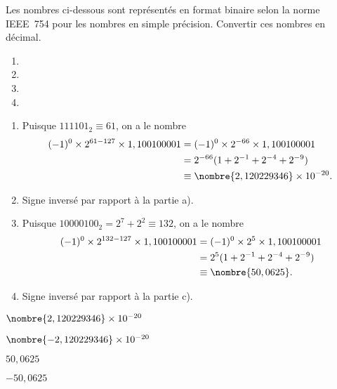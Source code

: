 \begin{exercice}
  \label{ex:ieee} Les nombres ci-dessous sont représentés en
  format binaire selon la norme IEEE~754 pour les nombres en simple
  précision. Convertir ces nombres en décimal.
  \begin{enumerate}
  \item {}
  \item {}
  \item {}
  \item {}
  \end{enumerate}
  \begin{sol}
    \begin{enumerate}
    \item Puisque $111101_2 \equiv 61$, on a le nombre
      \begin{align*}
        (-1)^0 \times 2^{61 - 127} \times 1,100100001
        &= (-1)^0 \times 2^{-66} \times 1,100100001 \\
        &= 2^{-66} (1 + 2^{-1} + 2^{-4} + 2^{-9}) \\
        &\equiv \nombre{2,120229346} \times 10^{-20}.
      \end{align*}
    \item Signe inversé par rapport à la partie a).
    \item Puisque $10000100_2 = 2^7 + 2^2 \equiv 132$, on a le nombre
      \begin{align*}
        (-1)^0 \times 2^{132 - 127} \times 1,100100001
        &= (-1)^0 \times 2^5 \times 1,100100001 \\
        &= 2^5 (1 + 2^{-1} + 2^{-4} + 2^{-9}) \\
        &\equiv \nombre{50,0625}.
      \end{align*}
    \item Signe inversé par rapport à la partie c).
    \end{enumerate}
  \end{sol}
  \begin{rep}
    \sloppy
    \begin{inparaenum}
    \item $\nombre{2,120229346} \times 10^{-20}$
    \item $\nombre{-2,120229346} \times 10^{-20}$
    \item $50,0625$
    \item $-50,0625$
    \end{inparaenum}
  \end{rep}
\end{exercice}

